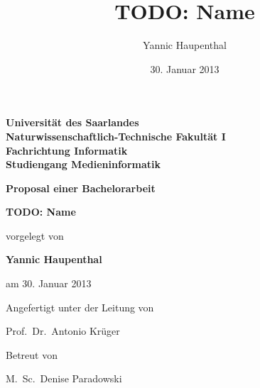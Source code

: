 \documentclass[a4paper]{report}
\title{TODO: Name}
\author{Yannic Haupenthal}
\date{30. Januar 2013}
\begin{document}
\pagestyle{empty}

\clearpage

\begin{titlepage}

	\vspace*{\fill}

	\begin{center}

	{\large \textbf{Universität des Saarlandes\\
	Naturwissenschaftlich-Technische Fakultät I\\
	Fachrichtung Informatik\\
	Studiengang Medieninformatik}}

	\vspace*{15ex}

	{\large \textbf{Proposal einer Bachelorarbeit}}

	\vspace*{5ex}

	{\Large \textbf{TODO: Name}}

	\vspace*{5ex}

	{\large vorgelegt von

	\textbf{Yannic Haupenthal}

	am 30. Januar 2013
	}

	\vspace*{25ex}

	{\large Angefertigt unter der Leitung von

	Prof.\ Dr.\ Antonio Krüger}

	\vspace*{3ex}
	
	{\large Betreut von

	M.\ Sc.\ Denise Paradowski}

	\end{center}

	\vspace*{\fill}

\end{titlepage}

\tableofcontents

\clearpage
\pagestyle{headings}

\setcounter{page}{0}
\end{document}
